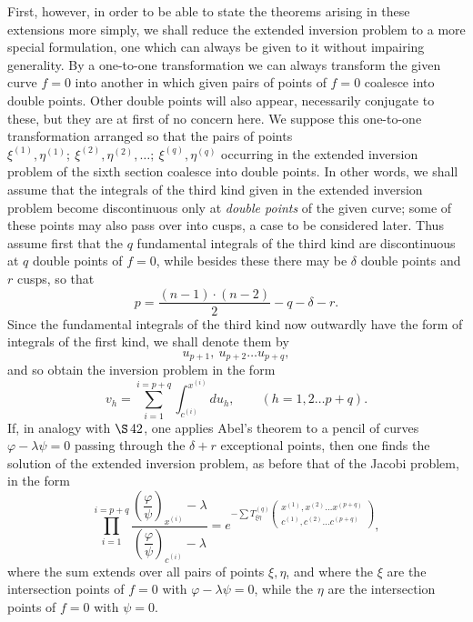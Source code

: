 \documentclass[10pt]{article}
\begin{document}
First, however, in order to be able to state the theorems arising in these extensions more simply, we shall reduce the extended inversion problem to a more special formulation, one which can always be given to it without impairing generality. By a one-to-one transformation we can always transform the given curve \(f=0\) into another in which given pairs of points of \(f=0\) coalesce into double points. Other double points will also appear, necessarily conjugate to these, but they are at first of no concern here. We suppose this one-to-one transformation arranged so that the pairs of points \(\xi^{(1)},\eta^{(1)};\ \xi^{(2)},\eta^{(2)},\ldots;\ \xi^{(q)},\eta^{(q)}\) occurring in the extended inversion problem of the sixth section coalesce into double points. In other words, we shall assume that the integrals of the third kind given in the extended inversion problem become discontinuous only at \emph{double points} of the given curve; some of these points may also pass over into cusps, a case to be considered later. Thus assume first that the \(q\) fundamental integrals of the third kind are discontinuous at \(q\) double points of \(f=0\), while besides these there may be \(\delta\) double points and \(r\) cusps, so that
\[
p=\frac{(n-1)\cdot(n-2)}{2}-q-\delta-r.
\]
Since the fundamental integrals of the third kind now outwardly have the form of integrals of the first kind, we shall denote them by
\[
u_{p+1},\ u_{p+2}\ldots u_{p+q},
\]
and so obtain the inversion problem in the form
\[
v_h=\sum_{i=1}^{i=p+q}\int_{c^{(i)}}^{x^{(i)}}du_h,
\qquad (h=1,2\ldots p+q).
\]
If, in analogy with \(\S\,42\), one applies Abel's theorem to a pencil of curves \(\varphi-\lambda\psi=0\) passing through the \(\delta+r\) exceptional points, then one finds the solution of the extended inversion problem, as before that of the Jacobi problem, in the form
\[
\prod_{i=1}^{i=p+q}
\frac{\left(\dfrac{\varphi}{\psi}\right)_{x^{(i)}}-\lambda}
     {\left(\dfrac{\varphi}{\psi}\right)_{c^{(i)}}-\lambda}
=
e^{-\sum T_{\xi\eta}^{(q)}
\begin{pmatrix}
x^{(1)},x^{(2)}\ldots x^{(p+q)}\\
c^{(1)},c^{(2)}\ldots c^{(p+q)}
\end{pmatrix}},
\]
where the sum extends over all pairs of points \(\xi,\eta\), and where the \(\xi\) are the intersection points of \(f=0\) with \(\varphi-\lambda\psi=0\), while the \(\eta\) are the intersection points of \(f=0\) with \(\psi=0\).
\end{document}

